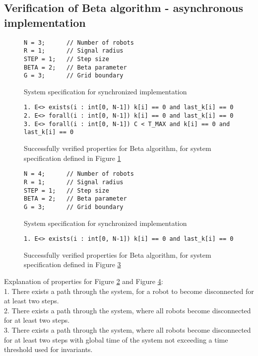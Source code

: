 \subsection{Verification of Beta algorithm - asynchronous implementation}
\begin{figure}[H]
\caption{System specification for synchronized implementation}
\label{fig:algorithm_asynchronous_system}
\begin{lstlisting}[style=code]
N = 3;      // Number of robots
R = 1;      // Signal radius
STEP = 1;   // Step size
BETA = 2;   // Beta parameter
G = 3;      // Grid boundary
\end{lstlisting}
\end{figure}

\begin{figure}[H]
\caption{Successfully verified properties for Beta algorithm, for system specification defined in Figure \ref{fig:algorithm_asynchronous_system}}
\label{fig:algorithm_asynchronous_properties}
\begin{lstlisting}[style=code]
1. E<> exists(i : int[0, N-1]) k[i] == 0 and last_k[i] == 0
2. E<> forall(i : int[0, N-1]) k[i] == 0 and last_k[i] == 0
3. E<> forall(i : int[0, N-1]) C < T_MAX and k[i] == 0 and last_k[i] == 0 
\end{lstlisting}    
\end{figure}

\begin{figure}[H]
\caption{System specification for synchronized implementation}
\label{fig:algorithm_asynchronous_system_2}
\begin{lstlisting}[style=code]
N = 4;      // Number of robots
R = 1;      // Signal radius
STEP = 1;   // Step size
BETA = 2;   // Beta parameter
G = 3;      // Grid boundary
\end{lstlisting}
\end{figure}

\begin{figure}[H]
\caption{Successfully verified properties for Beta algorithm, for system specification defined in Figure \ref{fig:algorithm_asynchronous_system_2}}
\label{fig:algorithm_asynchronous_properties_2}
\begin{lstlisting}[style=code]
1. E<> exists(i : int[0, N-1]) k[i] == 0 and last_k[i] == 0
\end{lstlisting}    
\end{figure}

\noindent
Explanation of properties for Figure \ref{fig:algorithm_asynchronous_properties} and Figure \ref{fig:algorithm_asynchronous_properties_2}:\\
1. There exists a path through the system, for a robot to become disconnected for at least two steps.\\
2. There exists a path through the system, where all robots become disconnected for at least two steps.\\
3. There exists a path through the system, where all robots become disconnected for at least two steps with global time of the system not exceeding a time threshold used for invariants.\\



